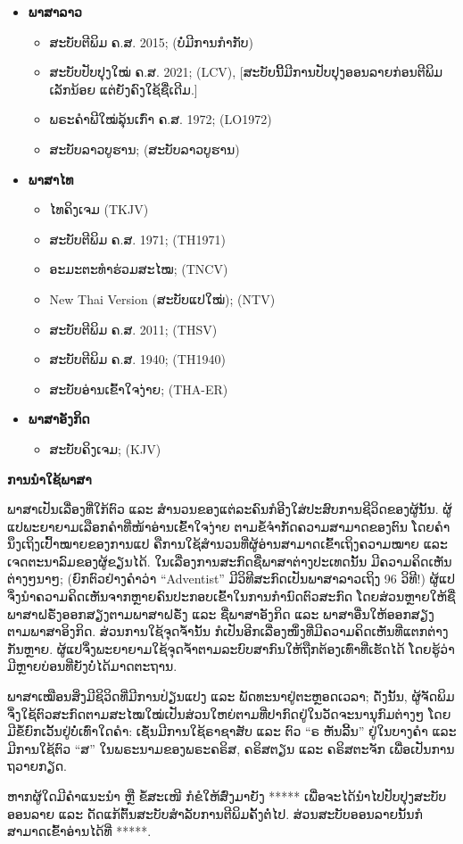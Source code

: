 \begin{itemize}
  \item \textbf{ພາສາລາວ}
  \begin{itemize}
    \item ສະບັບຕີພິມ ຄ.ສ. 2015; (ບໍ່ມີການກຳກັບ)
    \item ສະບັບປັບປຸງໃໝ່ ຄ.ສ. 2021; (LCV), [ສະບັບນີ້ມີການປັບປຸງອອນລາຍກ່ອນຕີພິມເລັກນ້ອຍ ແຕ່ຍັງຄົງໃຊ້ຊື່ເດີມ.]
    \item ພຣະຄຳພີໃໝ່ລຸ້ນເກົ່າ ຄ.ສ. 1972; (LO1972)
    \item ສະບັບລາວບູຮານ; (ສະບັບລາວບູຮານ)
  \end{itemize}

  \item \textbf{ພາສາໄທ}
  \begin{itemize}
    \item ໄທຄິງເຈມ (TKJV)
    \item ສະບັບຕີພິມ ຄ.ສ. 1971; (TH1971)
    \item ອະມະຕະທຳຮ່ວມສະໄໝ; (TNCV)
    \item New Thai Version (ສະບັບແປໃໝ່); (NTV)
    \item ສະບັບຕີພິມ ຄ.ສ. 2011; (THSV)
    \item ສະບັບຕີພິມ ຄ.ສ. 1940; (TH1940)
    \item ສະບັບອ່ານເຂົ້າໃຈງ່າຍ; (THA-ER)
  \end{itemize}
  
  \item  \textbf{ພາສາອັງກິດ}
  \begin{itemize}
    \item ສະບັບຄິງເຈມ; (KJV)
  \end{itemize}
\end{itemize}

\textbf{ການນຳໃຊ້ພາສາ}

ພາສາເປັນເລື່ອງທີ່ໃກ້ຕົວ ແລະ ສຳນວນຂອງແຕ່ລະຄົນກໍອີງໃສ່ປະສົບການຊີວິດຂອງຜູ້ນັ້ນ. ຜູ້ແປພະຍາຍາມເລືອກຄຳທີ່ໜ້າອ່ານເຂົ້າໃຈງ່າຍ ຕາມຂໍ້ຈຳກັດຄວາມສາມາດຂອງຕົນ ໂດຍຄຳນຶງເຖິງເປົ້າໝາຍຂອງການແປ ຄືການໃຊ້ສຳນວນທີ່ຜູ້ອ່ານສາມາດເຂົ້າເຖິງຄວາມໝາຍ ແລະ ເຈດຕະນາລົມຂອງຜູ້ຂຽນໄດ້. ໃນເລື່ອງການສະກົດຊື່ພາສາຕ່າງປະເທດນັ້ນ ມີຄວາມຄິດເຫັນຕ່າງໆນາໆ; (ຍົກຕົວຢ່າງຄຳວ່າ “Adventist” ມີວິທີສະກົດເປັນພາສາລາວເຖິງ 96 ວິທີ!) ຜູ້ແປຈຶ່ງນຳຄວາມຄິດເຫັນຈາກຫຼາຍຄົນປະກອບເຂົ້າໃນການກຳນົດຕົວສະກົດ ໂດຍສ່ວນຫຼາຍໃຫ້ຊື່ພາສາຝຣັ່ງອອກສຽງຕາມພາສາຝຣັ່ງ ແລະ ຊື່ພາສາອັງກິດ ແລະ ພາສາອື່ນໃຫ້ອອກສຽງຕາມພາສາອິງກິດ. ສ່ວນການໃຊ້ຈຸດຈ້ຳນັ້ນ ກໍເປັນອີກເລື່ອງໜຶ່ງທີ່ມີຄວາມຄິດເຫັນທີ່ແຕກຕ່າງກັນຫຼາຍ. ຜູ້ແປຈຶ່ງພະຍາຍາມໃຊ້ຈຸດຈ້ຳຕາມລະບົບສາກົນໃຫ້ຖືກຕ້ອງເທົ່າທີ່ເຮັດໄດ້ ໂດຍຮູ້ວ່າ ມີຫຼາຍບ່ອນທີ່ຍັງບໍ່ໄດ້ມາດຕະຖານ.

ພາສາເໝືອນສິ່ງມີຊິວິດທີ່ມີການປ່ຽນແປງ ແລະ ພັດທະນາຢູ່ຕະຫຼອດເວລາ; ດັ່ງນັ້ນ, ຜູ້ຈັດພິມຈຶ່ງໃຊ້ຕົວສະກົດຕາມສະໄໝໃໝ່ເປັນສ່ວນໃຫຍ່ຕາມທີ່ປາກົດຢູ່ໃນວັດຈະນານຸກົມຕ່າງໆ ໂດຍມີຂໍ້ຍົກເວັ້ນຢູ່ບໍ່ເທົ່າໃດຄຳ: ເຊັ່ນມີການໃຊ້ຣາຊາສັບ ແລະ ຕົວ “ຣ ຫັນລີ້ນ” ຢູ່ໃນບາງຄຳ ແລະ ມີການໃຊ້ຕົວ “ສ” ໃນພຣະນາມຂອງພຣະຄຣິສ, ຄຣິສຕຽນ ແລະ ຄຣິສຕະຈັກ ເພື່ອເປັນການຖວາຍກຽດ. 

ຫາກຜູ້ໃດມີຄຳແນະນຳ ຫຼື ຂໍ້ສະເໜີ ກໍຂໍໃຫ້ສົ່ງມາຍັງ ***** ເພື່ອຈະໄດ້ນຳໄປປັບປຸງສະບັບອອນລາຍ ແລະ ດັດແກ້ຕົ້ນສະບັບສຳລັບການຕີພິມຄັ້ງຕໍ່ໄປ. ສ່ວນສະບັບອອນລາຍນັ້ນກໍສາມາດເຂົ້າອ່ານໄດ້ທີ່ *****.
